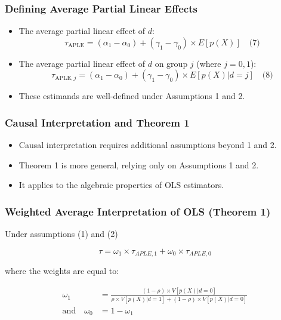 \begin{frame}
\frametitle{Defining Average Partial Linear Effects}
\begin{itemize}
    \item The average partial linear effect of \( d \):
    \[ \tau_{\text{APLE}} = (\alpha_1 - \alpha_0) + (\gamma_1 - \gamma_0) \times E[p(X)] \quad \text{(7)} \]
    \item The average partial linear effect of \( d \) on group \( j \) (where \( j = 0, 1 \)):
    \[ \tau_{\text{APLE}, j} = (\alpha_1 - \alpha_0) + (\gamma_1 - \gamma_0) \times E[p(X) | d = j] \quad \text{(8)} \]
    \item These estimands are well-defined under Assumptions 1 and 2.
\end{itemize}
\end{frame}

\begin{frame}
\frametitle{Causal Interpretation and Theorem 1}
\begin{itemize}
    \item Causal interpretation requires additional assumptions beyond 1 and 2.
    \item Theorem 1 is more general, relying only on Assumptions 1 and 2.
    \item It applies to the algebraic properties of OLS estimators.
\end{itemize}
\end{frame}

\begin{frame}
\frametitle{Weighted Average Interpretation of OLS (Theorem 1)}

Under assumptions (1) and (2)

$$\tau = \omega_1 \times \tau_{APLE,1} + \omega_0 \times \tau_{APLE,0}$$
 
 where the weights are equal to:
 
\begin{align*}
\omega_1 &= \frac{(1-\rho) \times V[p(X)|d=0]}{\rho \times V[p(X)|d=1] + (1-\rho) \times V[p(X)|d=0]} \\
\text{and} \quad \omega_0 &= 1 - \omega_1
\end{align*}

\end{frame}

